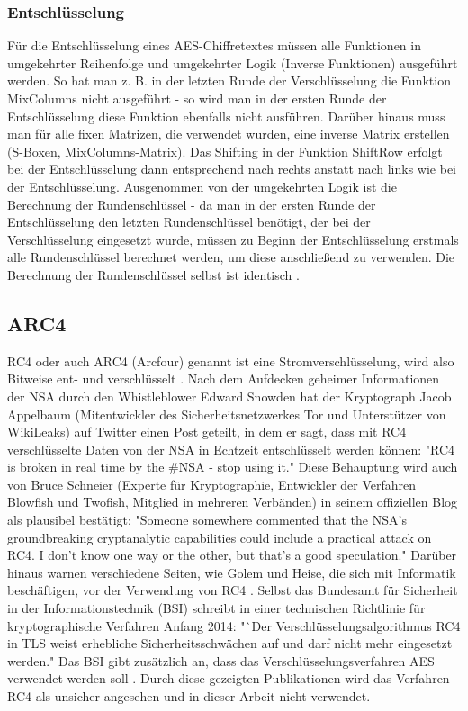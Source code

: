 \documentclass[10pt, a4paper,headsepline,pointednumbers]{scrreprt}
\begin{document}
\subsubsection{Entschlüsselung}
Für die Entschlüsselung eines AES-Chiffretextes müssen alle Funktionen in umgekehrter Reihenfolge und umgekehrter Logik (Inverse Funktionen) ausgeführt werden. So hat man z. B. in der letzten Runde der Verschlüsselung die Funktion MixColumns nicht ausgeführt - so wird man in der ersten Runde der Entschlüsselung diese Funktion ebenfalls nicht ausführen. Darüber hinaus muss man für alle fixen Matrizen, die verwendet wurden, eine inverse Matrix erstellen (S-Boxen, MixColumns-Matrix). Das Shifting in der Funktion ShiftRow erfolgt bei der Entschlüsselung dann entsprechend nach rechts anstatt nach links wie bei der Entschlüsselung. Ausgenommen von der umgekehrten Logik ist die Berechnung der Rundenschlüssel - da man in der ersten Runde der Entschlüsselung den letzten Rundenschlüssel benötigt, der bei der Verschlüsselung eingesetzt wurde, müssen zu Beginn der Entschlüsselung erstmals alle Rundenschlüssel berechnet werden, um diese anschließend zu verwenden. Die Berechnung der Rundenschlüssel selbst ist identisch \citep[S. 110ff]{book:understanding-crypto}.



\subsection{ARC4}
RC4 oder auch ARC4 (Arcfour) genannt ist eine Stromverschlüsselung, wird also Bitweise ent- und verschlüsselt \citep[S. 455]{book:angewandte-krypto}.
Nach dem Aufdecken geheimer Informationen der NSA durch den Whistleblower Edward Snowden hat der Kryptograph Jacob Appelbaum (Mitentwickler des Sicherheitsnetzwerkes Tor und Unterstützer von WikiLeaks) auf Twitter einen Post geteilt, in dem er sagt, dass mit RC4 verschlüsselte Daten von der NSA in Echtzeit entschlüsselt werden können: "RC4 is broken in real time by the \#NSA - stop using it." \cite{website:twitter-appelbaum}
Diese Behauptung wird auch von Bruce Schneier (Experte für Kryptographie, Entwickler der Verfahren Blowfish und Twofish, Mitglied in mehreren Verbänden) in seinem offiziellen Blog als plausibel bestätigt: "Someone somewhere commented that the NSA's groundbreaking cryptanalytic capabilities could include a practical attack on RC4. I don't know one way or the other, but that's a good speculation." \cite{website:schneier-breaking-most-enc}
Darüber hinaus warnen verschiedene Seiten, wie Golem und Heise, die sich mit Informatik beschäftigen, vor der Verwendung von RC4 \cite{website:heise-nsa, website:golem-rc4, website:theregister-rc4}.
Selbst das Bundesamt für Sicherheit in der Informationstechnik (BSI) schreibt in einer technischen Richtlinie für kryptographische Verfahren Anfang 2014: "`Der Verschlüsselungsalgorithmus RC4 in TLS weist erhebliche Sicherheitsschwächen auf und darf nicht mehr eingesetzt werden." Das BSI gibt zusätzlich an, dass das Verschlüsselungsverfahren AES verwendet werden soll \cite{website:bsi-rc4}.
Durch diese gezeigten Publikationen wird das Verfahren RC4 als unsicher angesehen und in dieser Arbeit nicht verwendet.
\end{document}
